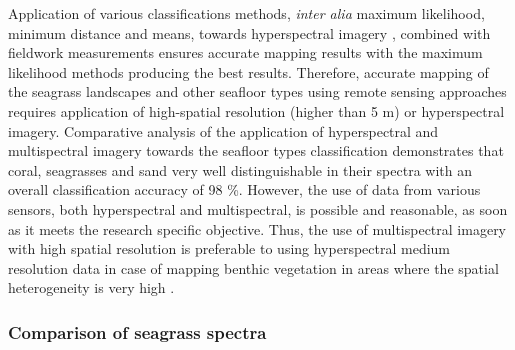 \documentclass[11pt]{article}
\begin{document}
Application of various classifications methods, \textit{inter alia} maximum likelihood, minimum distance and means, towards
hyperspectral imagery \cite{Peneva08}\label{Peneva08}, combined with fieldwork measurements ensures accurate
mapping results with the maximum likelihood methods producing the best results. 
Therefore, accurate mapping of the seagrass landscapes and other seafloor types using remote sensing
approaches requires application of high-spatial resolution (higher than 5 m) or hyperspectral imagery.
Comparative analysis of the application of hyperspectral\label{sec:2.4.2} and multispectral imagery towards the
seafloor types classification \cite{Hochberg03a}\label{Hochberg03a} demonstrates that coral, seagrasses and
sand very well distinguishable in their spectra with an overall classification accuracy of 98 \%.
However, the use of data from various sensors, both hyperspectral and multispectral, is possible and
reasonable, as soon as it meets the research specific objective. 
Thus, the use of multispectral imagery
with high spatial resolution is preferable to using hyperspectral medium resolution data in case of
mapping benthic vegetation in areas where the spatial heterogeneity is very high \cite{Vahtmae07}\label{Vahtmae07}.

\subsubsection{Comparison of seagrass spectra }\label{sec:2.5.3}
\end{document}
